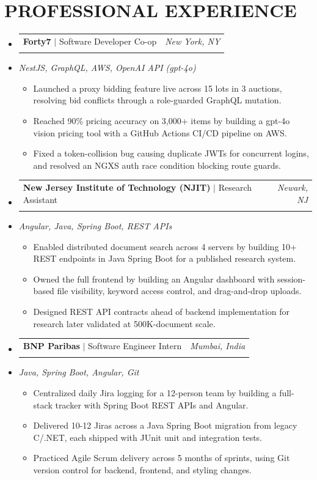 \documentclass[letterpaper,11pt]{article}
\makeatletter
\newcommand{\resumeItem}[1]{
  \item\small{#1\vspace{-3pt}}
}
\newcommand{\resumeStack}[1]{
  \vspace{1pt}\item\small{\textit{#1}}\vspace{-6pt}
}
\newcommand{\resumeExpHeading}[4]{
  \vspace{-3pt}\item
    \begin{tabular*}{1.0\textwidth}[t]{l@{\extracolsep{\fill}}r}
      \textbf{\large #1} $|$ #2 & \textit{\large #3} \\
       & \text{\small #4} \\
    \end{tabular*}\vspace{-9pt}
}
\newcommand{\resumeItemListStart}{\begin{itemize}[leftmargin=0.15in, label=$\bullet$]}
\newcommand{\resumeItemListEnd}{\end{itemize}\vspace{-7pt}}
\newcommand{\resumeSubHeadingListStart}{\begin{itemize}[leftmargin=0.0in, label={}]}
\newcommand{\resumeSubHeadingListEnd}{\end{itemize}}
\makeatother
\begin{document}
\section{PROFESSIONAL EXPERIENCE}
\resumeSubHeadingListStart
\vspace{10pt}
\resumeExpHeading
{Forty7}{Software Developer Co-op}{New York, NY}{Jan 2026 -- May 2026}
\vspace{-13pt}
\resumeStack{NestJS, GraphQL, AWS, OpenAI API (gpt-4o)}
\resumeItemListStart
  \resumeItem{Launched a proxy bidding feature live across 15 lots in 3 auctions, resolving bid conflicts through a role-guarded GraphQL mutation.}
  \resumeItem{Reached 90\% pricing accuracy on 3,000+ items by building a gpt-4o vision pricing tool with a GitHub Actions CI/CD pipeline on AWS.}
  \resumeItem{Fixed a token-collision bug causing duplicate JWTs for concurrent logins, and resolved an NGXS auth race condition blocking route guards.}
\resumeItemListEnd
\vspace{10pt}
\resumeExpHeading
{New Jersey Institute of Technology (NJIT)}{Research Assistant}{Newark, NJ}{Apr 2025 -- Sep 2025}
\vspace{-13pt}
\resumeStack{Angular, Java, Spring Boot, REST APIs}
\resumeItemListStart
  \resumeItem{Enabled distributed document search across 4 servers by building 10+ REST endpoints in Java Spring Boot for a published research system.}
  \resumeItem{Owned the full frontend by building an Angular dashboard with session-based file visibility, keyword access control, and drag-and-drop uploads.}
  \resumeItem{Designed REST API contracts ahead of backend implementation for research later validated at 500K-document scale.}
\resumeItemListEnd
\vspace{10pt}
\resumeExpHeading
{BNP Paribas}{Software Engineer Intern}{Mumbai, India}{Jan 2024 -- Jul 2024}
\vspace{-13pt}
\resumeStack{Java, Spring Boot, Angular, Git}
\resumeItemListStart
  \resumeItem{Centralized daily Jira logging for a 12-person team by building a full-stack tracker with Spring Boot REST APIs and Angular.}
  \resumeItem{Delivered 10-12 Jiras across a Java Spring Boot migration from legacy C/.NET, each shipped with JUnit unit and integration tests.}
  \resumeItem{Practiced Agile Scrum delivery across 5 months of sprints, using Git version control for backend, frontend, and styling changes.}
\resumeItemListEnd

\resumeSubHeadingListEnd

\vspace{-3pt}
\end{document}
